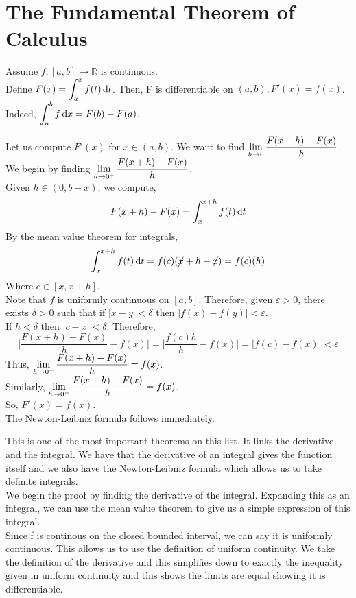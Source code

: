 \documentclass[12pt]{article}
\begin{document}
\section{The Fundamental Theorem of Calculus}
\begin{theo}{}
Assume \(f: [a, b]\to \mathbb R\) is continuous.\\
Define \(F(x) = \displaystyle\int_a^x f(t) \,\mathrm{d} t\). Then, F is differentiable on \((a, b), F'(x) = f(x)\).\\
Indeed, \(\displaystyle\int_a^b f \,\mathrm{d} x = F(b) - F(a)\).    
\end{theo}
\begin{prf}{}
Let us compute \(F'(x)\) for \(x\in(a, b)\). We want to find \(\displaystyle\lim_{h\to 0} \frac{F(x+h) - F(x)}{h}\).\\
We begin by finding \(\displaystyle\lim_{h\to 0^+} \frac{F(x+h) - F(x)}{h}\).\\
Given \(h\in (0, b-x)\), we compute, \[F(x+h) - F(x) = \displaystyle\int_x^{x+h}f(t)\,\mathrm{d} t\]
By the mean value theorem for integrals,
\[\displaystyle\int_x^{x+h} f(t) \,\mathrm{d} t = f(c)(\cancel{x}+ h - \cancel{x}) = f(c)(h)\]
Where \(c\in [x, x+h]\).\\
Note that \(f\) is uniformly continuous on \([a, b]\). Therefore, given \(\varepsilon > 0\), there exists \(\delta > 0\) such that if \(|x-y| < \delta\) then \(|f(x) - f(y)| < \varepsilon\).\\
If \(h < \delta\) then \(|c- x| < \delta\). Therefore, \[\bigg\vert\frac{F(x+h) - F(x)}{h} - f(x)\bigg\vert = \bigg\vert\frac{f(c)h}{h}-f(x)\bigg\vert = |f(c) - f(x)| < \varepsilon\]
Thus, \(\displaystyle\lim_{h\to 0^+} \frac{F(x+h) - F(x)}{h} = f(x)\).\\
Similarly, \(\displaystyle\lim_{h\to 0^-} \frac{F(x+h) - F(x)}{h} = f(x)\).\\
So, \(F'(x) = f(x)\).\\
The Newton-Leibniz formula follows immediately.
\end{prf}
\begin{explanation}{}       
    This is one of the most important theorems on this list. It links the derivative and the integral. We have that the derivative of an integral gives the function itself and we also have the Newton-Leibniz formula which allows us to take definite integrals.\\
We begin the proof by finding the derivative of the integral. Expanding this as an integral, we can use the mean value theorem to give us a simple expression of this integral.\\
Since f is continous on the closed bounded interval, we can say it is uniformly continuous. This allows us to use the definition of uniform continuity. We take the definition of the derivative and this simplifies down to exactly the inequality given in uniform continuity and this shows the limits are equal showing it is differentiable.\\
\end{explanation}
\end{document}
